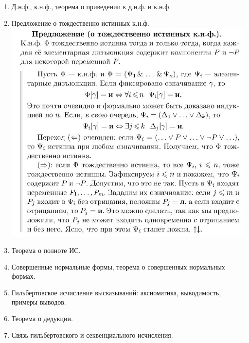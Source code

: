 \documentclass[a4paper]{article}
\theoremstyle{definition}
\begin{document}
\begin{enumerate}
\begin{proof}
       \end{proof}
 \item Д.н.ф., к.н.ф., теорема о приведении к д.н.ф. и к.н.ф.
 \item Предложение о тождественно истинных к.н.ф.
       \mbox{}\\ \includegraphics[scale=0.35]{37.jpg}
 \item Теорема о полноте ИС.
 \item Совершенные нормальные формы, теорема о совершенных нормальных формах.
 \item Гильбертовское исчисление высказываний: аксиоматика, выводимость, примеры выводов.
 \item Теорема о дедукции.
 \item Связь гильбертовского и секвенциального исчисления.
\end{enumerate}
\end{document}
